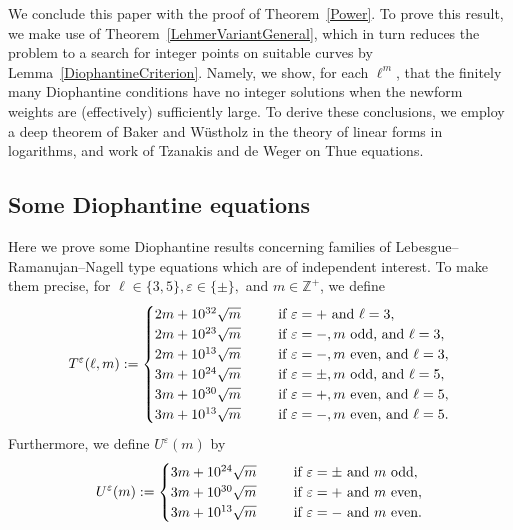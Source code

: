 \documentclass[12pt]{amsart}
\newcommand{\Z}{\mathbb{Z}}
\newcommand{\?}{\color{red}?}
\numberwithin{equation}{section}
\begin{document}
We conclude this paper with the proof of Theorem~\ref{Power}. To prove this result,
we make use of Theorem~\ref{LehmerVariantGeneral}, which in turn reduces the problem
to a search for integer points on suitable curves by Lemma~\ref{DiophantineCriterion}.
Namely, we show, for each $\ell^m$, that the
finitely many Diophantine conditions have no integer solutions when the newform weights are (effectively) sufficiently large.
To derive these conclusions, we employ a deep theorem of Baker and W\"ustholz \cite{BW} in the theory
of linear forms in logarithms, and  work of Tzanakis and de Weger \cite{TW}
on Thue equations.

\subsection{Some Diophantine equations}
Here we prove some Diophantine results concerning families of Lebesgue--Ramanujan--Nagell type equations which are
of independent interest.
To make them precise,
for $\ell\in \{3, 5\}, \varepsilon\in \{\pm\},$ and $m\in \Z^{+}$, we define
\begin{equation}
T^{\varepsilon}(\ell,m):= \begin{cases} 2m+10^{32}\sqrt{m} \ \ \ \ \ &{\text {\rm if $\varepsilon=+$ and $\ell=3$}},\\
2m+10^{23}\sqrt{m} \ \ \ \ \ &{\text {\rm if $\varepsilon=-, m$ odd, and $\ell=3$}},\\
2m+10^{13}\sqrt{m} \ \ \ \ \ &{\text {\rm if $\varepsilon=-, m$ even, and $\ell=3$}},\\

3m+10^{24}\sqrt{m} \ \ \ \ \ &{\text {\rm if $\varepsilon=\pm , m$ odd, and $\ell=5$}},\\
3m+10^{30}\sqrt{m} \ \ \ \ \ &{\text {\rm if $\varepsilon=+, m$ even, and $\ell=5$}},\\
3m+10^{13}\sqrt{m} \ \ \ \ \ &{\text {\rm if $\varepsilon=-, m$ even, and $\ell=5$}}.\\                            \end{cases}
\end{equation}           
Furthermore, we define  $U^{\varepsilon}(m)$ by
                      \begin{equation}
U^{\varepsilon}(m):= \begin{cases}  3m+10 ^{24}\sqrt{m}\ \ \ \ \ &{\text {\rm if $\varepsilon=\pm $ and $m$ odd}},\\
3m+10^{30}\sqrt{m} \ \ \ \ \ &{\text {\rm if $\varepsilon=+$ and $m$ even}},\\
3m+10^{13}\sqrt{m} \ \ \ \ \ &{\text {\rm if $\varepsilon=-$ and $m$ even}}.
                                   \end{cases}
\end{equation}          
\end{document}
